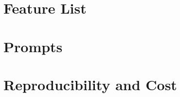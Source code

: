 \section{Feature List}\label{app:features}

\section{Prompts}\label{app:prompts}

\section{Reproducibility and Cost}\label{app:reproducibility}
